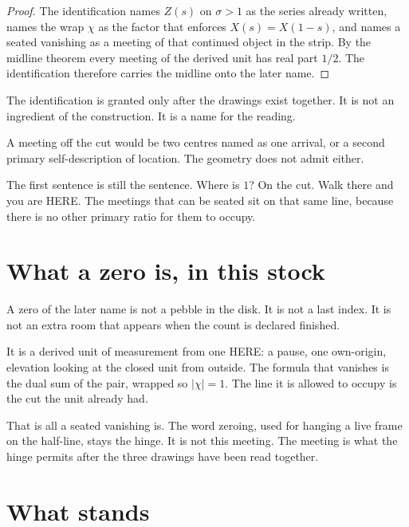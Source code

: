 \documentclass[10pt,a4paper]{article}
\theoremstyle{plain}
\theoremstyle{definition}
\begin{document}
\begin{proof}
The identification names $Z(s)$ on $\sigma>1$ as the series already written, names the wrap $\chi$ as the factor that enforces $X(s)=X(1-s)$, and names a seated vanishing as a meeting of that continued object in the strip.
By the midline theorem every meeting of the derived unit has real part $1/2$.
The identification therefore carries the midline onto the later name.
\end{proof}

The identification is granted only after the drawings exist together.
It is not an ingredient of the construction.
It is a name for the reading.

A meeting off the cut would be two centres named as one arrival, or a second primary self-description of location.
The geometry does not admit either.

The first sentence is still the sentence.
Where is $1$?
On the cut.
Walk there and you are HERE.
The meetings that can be seated sit on that same line, because there is no other primary ratio for them to occupy.

\section{What a zero is, in this stock}

A zero of the later name is not a pebble in the disk.
It is not a last index.
It is not an extra room that appears when the count is declared finished.

It is a derived unit of measurement from one HERE: a pause, one own-origin, elevation looking at the closed unit from outside.
The formula that vanishes is the dual sum of the pair, wrapped so $|\chi|=1$.
The line it is allowed to occupy is the cut the unit already had.

That is all a seated vanishing is.
The word zeroing, used for hanging a live frame on the half-line, stays the hinge.
It is not this meeting.
The meeting is what the hinge permits after the three drawings have been read together.

\section{What stands}
\end{document}
